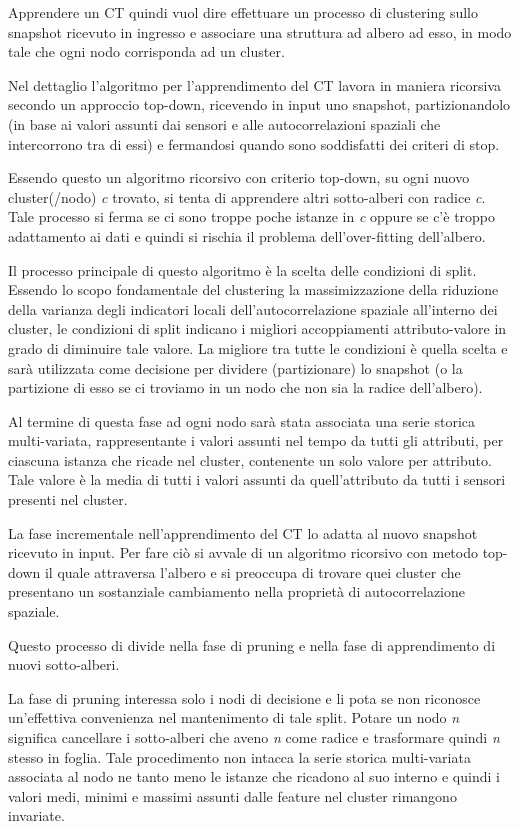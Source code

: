 \documentclass[12pt,a4paper,twoside,openright]{book}
\begin{document}
Apprendere un CT quindi vuol dire effettuare un processo di clustering sullo snapshot ricevuto in ingresso e associare una struttura ad albero ad esso, in modo tale che ogni nodo corrisponda ad un cluster. 

Nel dettaglio l'algoritmo per l'apprendimento del CT lavora in maniera ricorsiva secondo un approccio top-down, ricevendo in input uno snapshot, partizionandolo (in base ai valori assunti dai sensori e alle autocorrelazioni spaziali che intercorrono tra di essi) e fermandosi quando sono soddisfatti dei criteri di stop. 

Essendo questo un algoritmo ricorsivo con criterio top-down, su ogni nuovo cluster(/nodo) \textit{c} trovato, si tenta di apprendere altri sotto-alberi con radice \textit{c}. Tale processo si ferma se ci sono troppe poche istanze in \textit{c} oppure se c'è troppo adattamento ai dati e quindi si rischia il problema dell'over-fitting dell'albero.

Il processo principale di questo algoritmo è la scelta delle condizioni di split. Essendo lo scopo fondamentale del clustering la massimizzazione della riduzione della varianza degli indicatori locali dell'autocorrelazione spaziale all'interno dei cluster, le condizioni di split indicano i migliori accoppiamenti attributo-valore in grado di diminuire tale valore. La migliore tra tutte le condizioni è quella scelta e sarà utilizzata come decisione per dividere (partizionare) lo snapshot (o la partizione di esso se ci troviamo in un nodo che non sia la radice dell'albero).

Al termine di questa fase ad ogni nodo sarà stata associata una serie storica multi-variata, rappresentante i valori assunti nel tempo da tutti gli attributi, per ciascuna istanza che ricade nel cluster, contenente un solo valore per attributo. Tale valore è la media di tutti i valori assunti da quell'attributo da tutti i sensori presenti nel cluster.

La fase incrementale nell'apprendimento del CT lo adatta al nuovo snapshot ricevuto in input. Per fare ciò si avvale di un algoritmo ricorsivo con metodo top-down il quale attraversa l'albero e si preoccupa di trovare quei cluster che presentano un sostanziale cambiamento nella proprietà di autocorrelazione spaziale. 

Questo processo di divide nella fase di pruning e nella fase di apprendimento di nuovi sotto-alberi.

La fase di pruning interessa solo i nodi di decisione e li pota se non riconosce un'effettiva convenienza nel mantenimento di tale split. Potare un nodo \textit{n} significa cancellare i sotto-alberi che aveno \textit{n} come radice e trasformare quindi \textit{n} stesso in foglia. Tale procedimento non intacca la serie storica multi-variata associata al nodo ne tanto meno le istanze che ricadono al suo interno e quindi i valori medi, minimi e massimi assunti dalle feature nel cluster rimangono invariate. 
\end{document}
